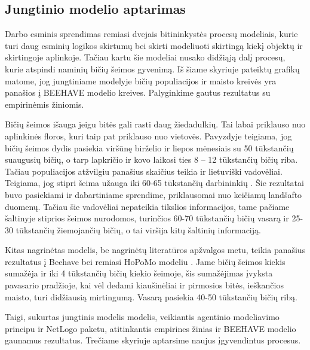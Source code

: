 \documentclass{VUMIFPSmagistrinis}
\begin{document}
\subsection{Jungtinio modelio aptarimas}


Darbo esminis sprendimas remiasi dvejais bitininkystės procesų modeliais, kurie turi daug esminių logikos skirtumų bei skirti modeliuoti skirtingą kiekį objektų ir skirtingoje aplinkoje. Tačiau kartu šie modeliai nusako didžiąją dalį procesų, kurie atspindi naminių bičių šeimos gyvenimą. Iš šiame skyriuje pateiktų grafikų matome, jog jungtiniame modelyje bičių populiacijos ir maisto kreivės yra panašios į BEEHAVE modelio kreives. Palyginkime gautus rezultatus su empirinėmis žiniomis.

Bičių šeimos išauga jeigu bitės gali rasti daug žiedadulkių. Tai labai priklauso nuo aplinkinės floros, kuri taip pat priklauso nuo vietovės. Pavyzdyje \cite{Oli15} teigiama, jog bičių šeimos dydis pasiekia viršūnę birželio ir liepos mėnesiais su 50 tūkstančių suaugusių bičių, o tarp lapkričio ir kovo laikosi ties 8 – 12 tūkstančių bičių riba. Tačiau populiacijos atžvilgiu panašius skaičius teikia ir lietuviški vadovėliai. Teigiama, jog stipri šeima užauga iki 60-65 tūkstančių darbininkių \cite{Kar00}. Šie rezultatai buvo pasiekiami ir dabartiniame sprendime, priklausomai nuo keičiamų landšafto duomenų. Tačiau šie vadovėliai nepateikia tikslios informacijos, tame pačiame šaltinyje stiprios šeimos nurodomos, turinčios 60-70 tūkstančių bičių vasarą ir 25-30 tūkstančių žiemojančių bičių, o tai viršija kitų šaltinių informaciją. 

Kitas nagrinėtas modelis, be nagrinėtų literatūros apžvalgos metu, teikia panašius rezultatus į Beehave bei remiasi HoPoMo modeliu \cite{ScC07,BWZ16}. Jame bičių šeimos kiekis sumažėja ir iki 4 tūkstančių bičių kiekio šeimoje, šis sumažėjimas įvyksta pavasario pradžioje, kai vėl dedami kiaušinėliai ir pirmosios bitės, ieškančios maisto, turi didžiausią mirtingumą. Vasarą pasiekia 40-50 tūkstančių bičių ribą.

Taigi, sukurtas jungtinis modelis modelis, veikiantis agentinio modeliavimo principu ir NetLogo paketu, atitinkantis empirines žinias ir BEEHAVE modelio gaunamus rezultatus. Trečiame skyriuje aptarsime naujus įgyvendintus procesus.
\end{document}
